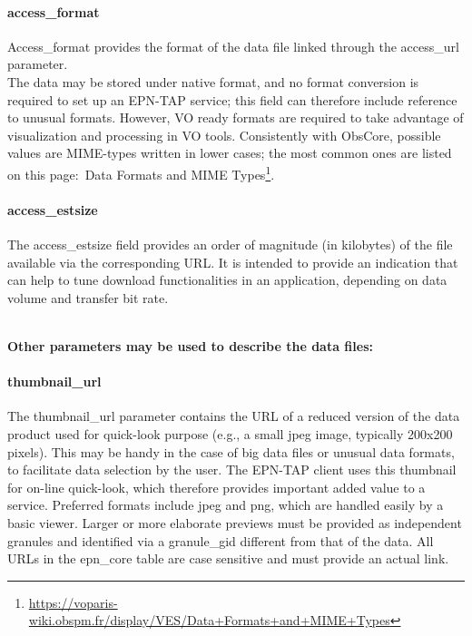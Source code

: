 \documentclass[11pt,a4paper]{ivoa}
\begin{document}
\paragraph{access\_format}

Access\_format provides the format of the data file linked through the access\_url parameter. \\The data may be stored under native format, and no format conversion is required to set up an EPN-TAP service; this field can therefore include reference to unusual formats. However, VO ready formats are required to take advantage of visualization and processing in VO tools. Consistently with ObsCore, possible values are MIME-types written in lower cases; the most common ones are listed on this page: Data Formats and MIME Types\footnote{\url{https://voparis-wiki.obspm.fr/display/VES/Data+Formats+and+MIME+Types}}.

\paragraph{access\_estsize}

The access\_estsize field provides an order of magnitude (in kilobytes) of the file available via the corresponding URL. It is intended to provide an indication that can help to tune download functionalities in an application, depending on data volume and transfer bit rate.

\\

\textbf{Other parameters may be used to describe the data files:}

\paragraph{thumbnail\_url}

The thumbnail\_url parameter contains the URL of a reduced version of the data product used for quick-look purpose (e.g., a small jpeg image, typically 200x200 pixels). This may be handy in the case of big data files or unusual data formats, to facilitate data selection by the user. The EPN-TAP client uses this thumbnail for on-line quick-look, which therefore provides important added value to a service. Preferred formats include jpeg and png, which are handled easily by a basic viewer. Larger or more elaborate previews must be provided as independent granules and identified via a granule\_gid different from that of the data. All URLs in the epn\_core table are case sensitive and must provide an actual link.
\end{document}
